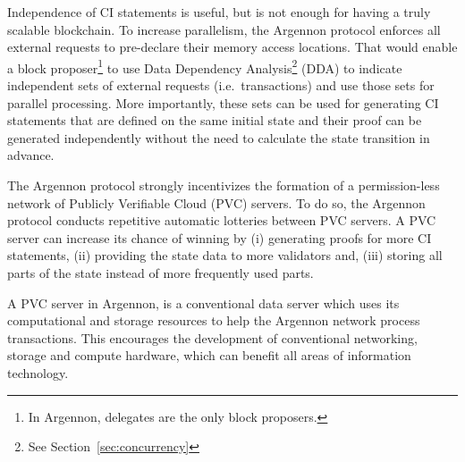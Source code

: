 
Independence of CI statements is useful, but is not enough for having a truly scalable blockchain. To increase
parallelism, the Argennon protocol enforces all external requests to pre-declare their memory access locations. That
would enable a block proposer\footnote{In Argennon, delegates are the only block proposers.} to use Data Dependency
Analysis\footnote{See Section~\ref{sec:concurrency}} (DDA) to indicate independent sets of external requests (i.e.\
transactions) and use those sets for parallel processing. More importantly, these sets can be used for generating CI
statements that
are defined on the same initial state and their proof can be generated independently without the need to calculate
the state transition in advance.

The Argennon protocol strongly incentivizes the formation of a permission-less network of Publicly Verifiable
Cloud (PVC) servers. To do so, the Argennon protocol conducts repetitive automatic lotteries between PVC servers.
A PVC server can increase its chance of winning by (i) generating proofs for more CI statements, (ii) providing the
state data to more validators and, (iii) storing all parts of the state instead of more frequently used parts.

A PVC server in Argennon, is a conventional data server which uses its computational and
storage resources to help the Argennon network process transactions. This encourages the development
of conventional networking, storage and compute hardware, which can benefit all areas of information technology.
